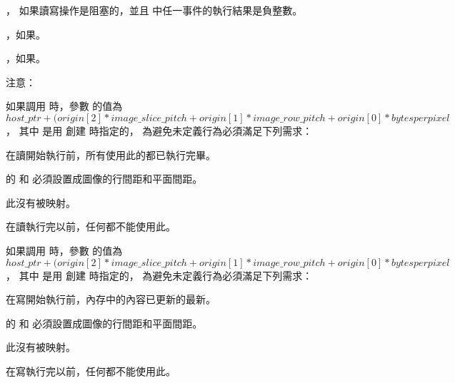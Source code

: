 \item {}，
  如果讀寫操作是阻塞的，並且  中任一事件的執行結果是負整數。

\item {}，如果\scdevfailres。
\item {}，如果\schostfailres。
\stopigBase

注意：

如果調用  時，參數  的值為
 $host\_ptr + (origin[2] * image\_slice\_pitch + origin[1] * image\_row\_pitch + origin[0] * bytes per pixel$，
其中  是用  創建  時指定的，
為避免未定義行為必須滿足下列需求：
\startigBase
\item 在讀開始執行前，所有使用此的都已執行完畢。

\item {} 的  和  必須設置成圖像的行間距和平面間距。

\item 此沒有被映射。

\item 在讀執行完以前，任何都不能使用此。
\stopigBase

如果調用  時，參數  的值為
 $host\_ptr + (origin[2] * image\_slice\_pitch + origin[1] * image\_row\_pitch + origin[0] * bytes per pixel$，
其中  是用  創建  時指定的，
為避免未定義行為必須滿足下列需求：
\startigBase
\item 在寫開始執行前，內存中的內容已更新的最新。

\item {} 的  和  必須設置成圖像的行間距和平面間距。

\item 此沒有被映射。

\item 在寫執行完以前，任何都不能使用此。
\stopigBase

